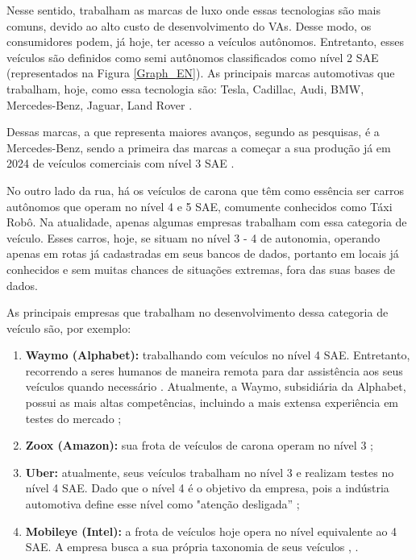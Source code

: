 Nesse sentido, trabalham as marcas de luxo onde essas tecnologias são mais comuns, devido ao alto custo de desenvolvimento do VAs. Desse modo, os consumidores podem, já hoje, ter acesso a veículos autônomos. Entretanto, esses veículos são definidos como semi autônomos classificados como nível 2 SAE (representados na Figura \ref{Graph_EN}). As principais marcas automotivas que trabalham, hoje, como essa tecnologia são: Tesla, Cadillac, Audi, BMW, Mercedes-Benz, Jaguar, Land Rover \cite{caio}. 

Dessas marcas, a que representa maiores avanços, segundo as pesquisas, é a Mercedes-Benz, sendo a primeira das marcas a começar a sua produção já em 2024 de veículos comerciais com nível 3 SAE \cite{mercedes3}.

No outro lado da rua, há os veículos de carona que têm como essência ser carros autônomos que operam no nível 4 e 5 SAE, comumente conhecidos como Táxi Robô. Na atualidade, apenas algumas empresas trabalham com essa categoria de veículo. Esses carros, hoje, se situam no nível 3 - 4 de autonomia, operando apenas em rotas já cadastradas em seus bancos de dados, portanto em locais já conhecidos e sem muitas chances de situações extremas, fora das suas bases de dados. 

As principais empresas que trabalham no desenvolvimento dessa categoria de veículo são, por exemplo:
\begin{enumerate}
   \item \textbf{Waymo (Alphabet):} trabalhando com veículos no nível 4 SAE. Entretanto, recorrendo a seres humanos de maneira remota para dar assistência aos seus veículos quando necessário \cite{waymo}. Atualmente, a Waymo, subsidiária da Alphabet, possui as mais altas competências, incluindo a mais extensa experiência em testes do mercado \cite{CAM};
   \item \textbf{Zoox (Amazon):} sua frota de veículos de carona operam no nível 3 \cite{zoox};
   \item \textbf{Uber:} atualmente, seus veículos trabalham no nível 3 e realizam testes no nível 4 SAE. Dado que o nível 4 é o objetivo da empresa, pois a indústria automotiva define esse nível como "atenção desligada” \cite{uber};
   \item \textbf{Mobileye (Intel):} a frota de veículos hoje opera no nível equivalente ao 4 SAE. A empresa busca a sua própria taxonomia de seus veículos \cite{mobileye}, \cite{mobileye1}.
\end{enumerate}

